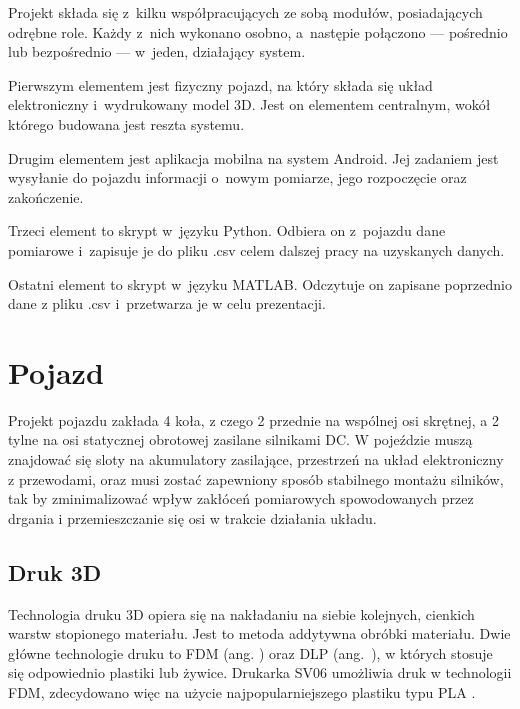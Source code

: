 \label{ch:project}

Projekt składa się z~kilku współpracujących ze sobą modułów, posiadających odrębne role. Każdy z~nich wykonano osobno, a~następie połączono --- pośrednio lub bezpośrednio --- w~jeden, działający system.

Pierwszym elementem jest fizyczny pojazd, na który składa się układ elektroniczny i~wydrukowany model 3D. Jest on elementem centralnym, wokół którego budowana jest reszta systemu.

Drugim elementem jest aplikacja mobilna na system Android. Jej zadaniem jest wysyłanie do pojazdu informacji o~nowym pomiarze, jego rozpoczęcie oraz zakończenie.

Trzeci element to skrypt w~języku Python. Odbiera on z~pojazdu dane pomiarowe i~zapisuje je do pliku .csv celem dalszej pracy na uzyskanych danych.

Ostatni element to skrypt w~języku MATLAB. Odczytuje on zapisane poprzednio dane z pliku .csv i~przetwarza je w celu prezentacji.

\section{Pojazd}
Projekt pojazdu zakłada 4 koła, z czego 2 przednie na wspólnej osi skrętnej, a 2 tylne na osi statycznej obrotowej zasilane silnikami DC. W pojeździe muszą znajdować się sloty na akumulatory zasilające, przestrzeń na układ elektroniczny z przewodami, oraz musi zostać zapewniony sposób stabilnego montażu silników, tak by zminimalizować wpływ zakłóceń pomiarowych spowodowanych przez drgania i przemieszczanie się osi w trakcie działania układu.

\subsection*{Druk 3D}
Technologia druku 3D opiera się na nakładaniu na siebie kolejnych, cienkich warstw stopionego materiału. Jest to metoda addytywna obróbki materiału. Dwie główne technologie druku to FDM (ang. ) oraz DLP (ang.~), w których stosuje się odpowiednio plastiki lub żywice\cite{bib:pracakrzysztofaserafina}. Drukarka SV06 umożliwia druk w technologii FDM, zdecydowano więc na użycie najpopularniejszego plastiku typu PLA .

